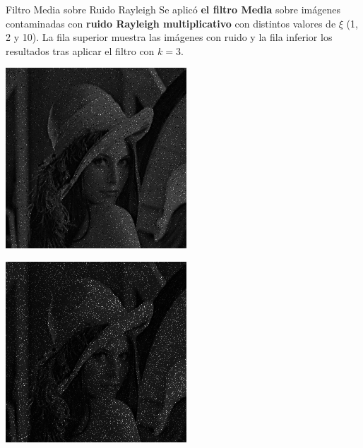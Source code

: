 \documentclass{beamer}
\begin{document}
\begin{frame}[fragile]{Filtro Media sobre Ruido Rayleigh}
	\justifying
	\footnotesize
	Se aplicó \textcolor{unahurverde}{\textbf{el filtro Media}} sobre imágenes contaminadas con \textcolor{unahurverde}{\textbf{ruido Rayleigh multiplicativo}}  
	con distintos valores de $\xi$ (1, 2 y 10).  
	La fila superior muestra las imágenes con ruido y la fila inferior los resultados tras aplicar el filtro con $k=3$.
	
	\centering
	\begin{minipage}{0.25\linewidth}
		\centering
		\includegraphics[width=\linewidth]{../results/lena_rayleigh_xi1}
	\end{minipage}\hfill
	\begin{minipage}{0.25\linewidth}
		\centering
		\includegraphics[width=\linewidth]{../results/lena_rayleigh_xi2}

\end{minipage}
\end{frame}
\end{document}
